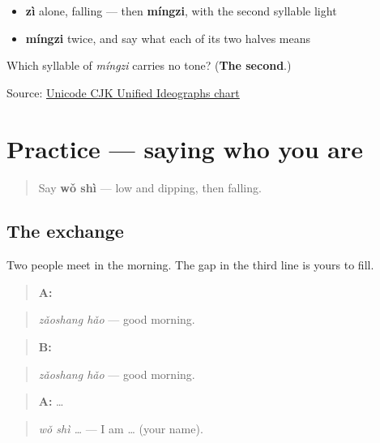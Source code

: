 \begin{itemize}
\raggedright
  \item \textbf{zì} alone, falling — then \textbf{míngzi}, with the second syllable light
  \item \textbf{míngzi} twice, and say what each of its two halves means
\end{itemize}

\begin{tcolorbox}[breakable,colback=teal!4,colframe=teal!35!black,title={Before you move on}]
Which syllable of \emph{míngzi} carries no tone? (\textbf{The second}.)

Source: \href{https://www.unicode.org/charts/PDF/U4E00.pdf}{Unicode CJK Unified Ideographs chart}
\end{tcolorbox}
\section[Practice]{Practice — saying who you are}

\label{lesson:ZH-C08-practice}



\begin{quote}
Say \textbf{wǒ shì} — low and dipping, then falling.
\end{quote}

\subsection*{The exchange}
Two people meet in the morning. The gap in the third line is yours to fill.

\begin{quote}
\textbf{A:} 
\end{quote}

\begin{quote}
\emph{zǎoshang hǎo} — good morning.
\end{quote}

\begin{quote}
\textbf{B:} 
\end{quote}

\begin{quote}
\emph{zǎoshang hǎo} — good morning.
\end{quote}

\begin{quote}
\textbf{A:}  …
\end{quote}

\begin{quote}
\emph{wǒ shì …} — I am … (your name).
\end{quote}

